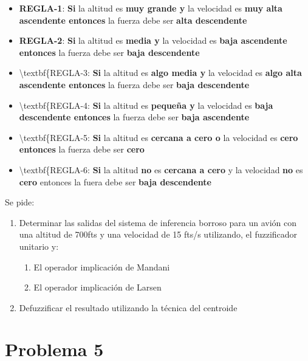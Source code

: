 \documentclass[
]{article}
\providecommand{\tightlist}{%
  \setlength{\itemsep}{0pt}\setlength{\parskip}{0pt}}
\begin{document}
\begin{itemize}
\item
  \textbf{REGLA-1}: \textbf{Si} la altitud es \textbf{muy grande y} la
  velocidad es \textbf{muy alta ascendente entonces} la fuerza debe ser
  \textbf{alta descendente}
\item
  \textbf{REGLA-2}: \textbf{Si} la altitud es \textbf{media y} la
  velocidad es \textbf{baja ascendente entonces} la fuerza debe ser
  \textbf{baja descendente}
\item
  \textbackslash textbf\{REGLA-3: \textbf{Si} la altitud es
  \textbf{algo media y} la velocidad es
  \textbf{algo alta ascendente entonces} la fuerza debe ser
  \textbf{baja descendente}
\item
  \textbackslash textbf\{REGLA-4: \textbf{Si} la altitud es
  \textbf{pequeña y} la velocidad es \textbf{baja descendente entonces}
  la fuerza debe ser \textbf{baja ascendente}
\item
  \textbackslash textbf\{REGLA-5: \textbf{Si} la altitud es
  \textbf{cercana a cero o} la velocidad es \textbf{cero entonces} la
  fuerza debe ser \textbf{cero}
\item
  \textbackslash textbf\{REGLA-6: \textbf{Si} la altitud \textbf{no} es
  \textbf{cercana a cero} y la velocidad \textbf{no} es \textbf{cero}
  entonces la fuera debe ser \textbf{baja descendente}
\end{itemize}

Se pide:

\begin{enumerate}
\def\labelenumi{\arabic{enumi}.}
\tightlist
\item
  Determinar las salidas del sistema de inferencia borroso para un avión
  con una altitud de 700fts y una velocidad de 15 fts/s utilizando, el
  fuzzificador unitario y:

  \begin{enumerate}
  \def\labelenumii{\alph{enumii}.}
  \tightlist
  \item
    El operador implicación de Mandani
  \item
    El operador implicación de Larsen
  \end{enumerate}
\item
  Defuzzificar el resultado utilizando la técnica del centroide
\end{enumerate}

\newpage

\hypertarget{problema-5}{%
\section{Problema 5}\label{problema-5}}
\end{document}
